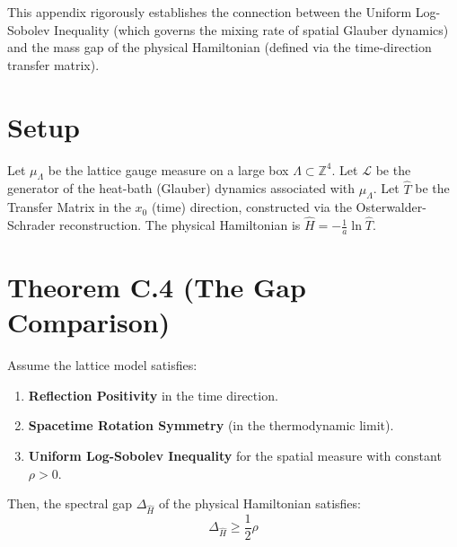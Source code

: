 This appendix rigorously establishes the connection between the Uniform Log-Sobolev Inequality (which governs the mixing rate of spatial Glauber dynamics) and the mass gap of the physical Hamiltonian (defined via the time-direction transfer matrix).

\section{Setup}
Let $\mu_\Lambda$ be the lattice gauge measure on a large box $\Lambda \subset \mathbb{Z}^4$.
Let $\mathcal{L}$ be the generator of the heat-bath (Glauber) dynamics associated with $\mu_\Lambda$.
Let $\hat{T}$ be the Transfer Matrix in the $x_0$ (time) direction, constructed via the Osterwalder-Schrader reconstruction. The physical Hamiltonian is $\hat{H} = -\frac{1}{a} \ln \hat{T}$.

\section{Theorem C.4 (The Gap Comparison)}
\label{thm:gap_equivalence}

\begin{theorem}
Assume the lattice model satisfies:
\begin{enumerate}
    \item \textbf{Reflection Positivity} in the time direction.
    \item \textbf{Spacetime Rotation Symmetry} (in the thermodynamic limit).
    \item \textbf{Uniform Log-Sobolev Inequality} for the spatial measure with constant $\rho > 0$.
\end{enumerate}
Then, the spectral gap $\Delta_{\hat{H}}$ of the physical Hamiltonian satisfies:
\begin{equation}
\Delta_{\hat{H}} \ge \frac{1}{2} \rho
\end{equation}
\end{theorem}

